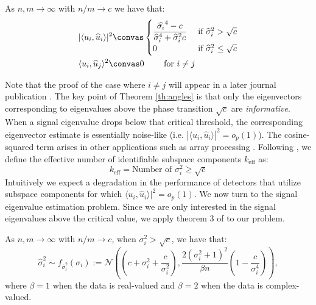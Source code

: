 \begin{Th}\label{th:angles}
As $n,m \longrightarrow \infty$ with $n/m \to c$ we have that:
\begin{equation*}
\begin{aligned}
&|\langle u_i,\widehat{u}_i\rangle|^2\convas
\begin{cases}
\dfrac{\widehat{\sigma_i}^4-c}{\widehat{\sigma}_{i}^4+\widehat{\sigma}_{i}^2c} & \text{ if } \widehat{\sigma}_{i}^2>\sqrt{c}\\
0 & \text{ if } \widehat{\sigma}_{i}^2\leq\sqrt{c}\\
\end{cases}\\
&\langle u_i,\widehat{u}_j\rangle ^2\convas 0 \qquad \textrm{ for } i \neq j\\
\end{aligned}
\end{equation*}
\end{Th}

Note that the proof of the case where $i\neq j$ will appear in a later journal publication \cite{asendorf}. The key point of Theorem \ref{th:angles} is that only the eigenvectors corresponding to eigenvalues above the phase transition $\sqrt{c}$ are \textit{informative}. When a signal eigenvalue drops below that critical threshold, the corresponding eigenvector estimate is essentially noise-like  (i.e. $|\langle u_i,\widehat{u}_i\rangle|^2=o_{p}(1)$). The cosine-squared term arises in other applications such as array processing \cite{cox1973resolving}. Following \cite{nadakuditi2008sample}, we define the effective number of identifiable subspace components $k_\text{eff}$ as:
\begin{equation}
\boxed{k_\text{eff} = \text{Number of } \sigma_i^2\geq\sqrt{c}}
\end{equation}
Intuitively we expect a degradation in the performance of detectors  that utilize subspace components for which $\langle u_i,\widehat{u}_i\rangle|^2=o_{p}(1)$.  We now turn to the signal eigenvalue estimation problem. Since we are only interested in the signal eigenvalues above the critical value, we apply theorem 3 of \cite{paul2007asymptotics} to our problem.

\begin{Th}\label{th:eigenvalues}
As $n,m \longrightarrow \infty$ with $n/m \to c$, when $\sigma_i^2 > \sqrt{c}$, we have that:
\begin{equation*}
\widehat{\sigma}_i^2\sim f_{\widehat{\sigma}_i^2}(\sigma_i) := \mathcal{N}\left(\left(c+\sigma_i^2+\frac{c}{\sigma_i^2}\right),\frac{2\left(\sigma_i^2+1\right)^2}{\beta n}\left(1-\frac{c}{\sigma_i^4}\right)\right),
\end{equation*}
where $\beta = 1$ when the data is real-valued and $\beta = 2$ when the data is complex-valued.
\end{Th}


